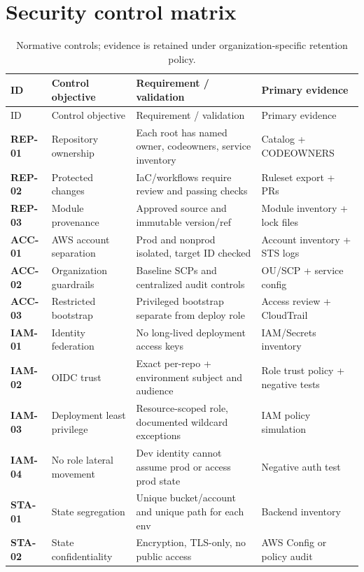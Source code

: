 \documentclass[10pt,letterpaper]{article}
\newcommand{\ctrl}[1]{\textbf{#1}}
\begin{document}
\section{Security control matrix}
\small
\setlength{\LTleft}{0pt}\setlength{\LTright}{0pt plus 1fill}
\begin{longtable}{@{}>{\raggedright\arraybackslash}p{13mm}>{\raggedright\arraybackslash}p{39mm}>{\raggedright\arraybackslash}p{64mm}>{\raggedright\arraybackslash}p{34mm}@{}}
\caption{Normative controls; evidence is retained under organization-specific retention policy.}\\
\toprule ID & Control objective & Requirement / validation & Primary evidence\\\midrule\endfirsthead
\toprule ID & Control objective & Requirement / validation & Primary evidence\\\midrule\endhead
\ctrl{REP-01} & Repository ownership & Each root has named owner, codeowners, service inventory & Catalog + CODEOWNERS\\
\ctrl{REP-02} & Protected changes & IaC/workflows require review and passing checks & Ruleset export + PRs\\
\ctrl{REP-03} & Module provenance & Approved source and immutable version/ref & Module inventory + lock files\\
\ctrl{ACC-01} & AWS account separation & Prod and nonprod isolated, target ID checked & Account inventory + STS logs\\
\ctrl{ACC-02} & Organization guardrails & Baseline SCPs and centralized audit controls & OU/SCP + service config\\
\ctrl{ACC-03} & Restricted bootstrap & Privileged bootstrap separate from deploy role & Access review + CloudTrail\\
\ctrl{IAM-01} & Identity federation & No long-lived deployment access keys & IAM/Secrets inventory\\
\ctrl{IAM-02} & OIDC trust & Exact per-repo + environment subject and audience & Role trust policy + negative tests\\
\ctrl{IAM-03} & Deployment least privilege & Resource-scoped role, documented wildcard exceptions & IAM policy simulation\\
\ctrl{IAM-04} & No role lateral movement & Dev identity cannot assume prod or access prod state & Negative auth test\\
\ctrl{STA-01} & State segregation & Unique bucket/account and unique path for each env & Backend inventory\\
\ctrl{STA-02} & State confidentiality & Encryption, TLS-only, no public access & AWS Config or policy audit\\

\end{longtable}
\end{document}
